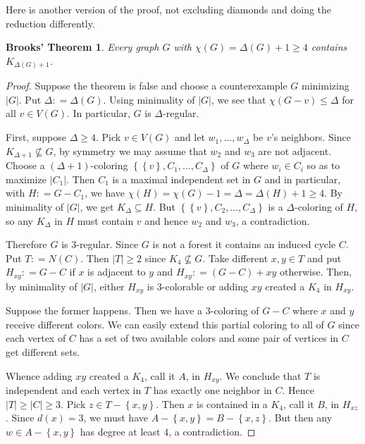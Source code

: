 \documentclass[12pt]{amsart}
\theoremstyle{plain}
\newtheorem*{Brooks}{Brooks' Theorem}
\theoremstyle{definition}
\theoremstyle{remark}
\newcommand{\set}[1]{\left\{ #1 \right\}}
\newcommand{\card}[1]{\left|#1\right|}
\newcommand{\DefinedAs}{\mathrel{\mathop:}=}
\begin{document}
Here is another version of the proof, not excluding diamonds and doing the reduction differently.

\begin{Brooks}
Every graph $G$ with $\chi(G) = \Delta(G) + 1 \geq 4$ contains
$K_{\Delta(G) + 1}$.
\end{Brooks}
\begin{proof}
Suppose the theorem is false and choose a counterexample $G$ minimizing
$\card{G}$.  Put $\Delta \DefinedAs \Delta(G)$. Using minimality of $\card{G}$,
we see that $\chi(G - v) \leq \Delta$ for all $v \in
V(G)$. In particular, $G$ is $\Delta$-regular.

First, suppose $\Delta \geq 4$.  Pick $v \in V(G)$ and let $w_1, \ldots,
w_\Delta$ be $v$'s neighbors. Since $K_{\Delta + 1} \not \subseteq G$, by
symmetry we may assume that $w_2$ and $w_3$ are not adjacent. Choose a $(\Delta
+ 1)$-coloring $\set{\set{v}, C_1, \ldots, C_\Delta}$ of $G$ where $w_i \in
C_i$ so as to maximize $\card{C_1}$.  Then $C_1$ is a maximal independent set in
$G$ and in particular, with $H \DefinedAs G - C_1$, we have $\chi(H) =
\chi(G) - 1 = \Delta = \Delta(H) + 1 \geq 4$.  By minimality of $\card{G}$, we
get $K_\Delta \subseteq H$.  But $\set{\set{v}, C_2, \ldots, C_\Delta}$ is a
$\Delta$-coloring of $H$, so any $K_\Delta$ in $H$ must contain $v$ and hence
$w_2$ and $w_3$, a contradiction.

Therefore $G$ is $3$-regular.  Since $G$ is not a forest it contains an induced
cycle $C$.  Put $T \DefinedAs N(C)$.  Then $\card{T} \geq 2$ since $K_4 \not
\subseteq G$.  Take different $x, y \in T$ and put $H_{xy} \DefinedAs G - C$ if
$x$ is adjacent to $y$ and $H_{xy} \DefinedAs (G-C) + xy$ otherwise.  Then, by
minimality of $\card{G}$, either $H_{xy}$ is $3$-colorable or adding $xy$
created a $K_4$ in $H_{xy}$.

Suppose the former happens.  Then we have a $3$-coloring of $G - C$
where $x$ and $y$ receive different colors.  We can easily extend this partial
coloring to all of $G$ since each vertex of $C$ has a set of two available
colors and some pair of vertices in $C$ get different sets. 

Whence adding $xy$ created a $K_4$, call it $A$, in $H_{xy}$.  We conclude that
$T$ is independent and each vertex in $T$ has exactly one neighbor in $C$.  Hence
$\card{T} \geq \card{C} \geq 3$. Pick $z \in T - \set{x,y}$.  Then $x$ is
contained in a $K_4$, call it $B$, in $H_{xz}$.  Since $d(x) = 3$, we must have
$A - \set{x,y} = B - \set{x, z}$.  But then any $w \in A - \set{x,y}$ has degree
at least $4$, a contradiction.
\end{proof}
\end{document}
